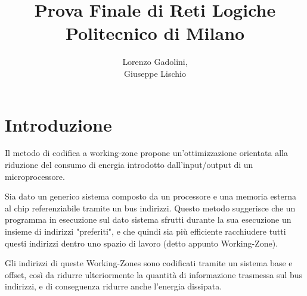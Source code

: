 \documentclass{article}
\title{Prova Finale di Reti Logiche\\ \large Politecnico di Milano}
\author{Lorenzo Gadolini, \\ Giuseppe Lischio}
\begin{document}
\maketitle


\tableofcontents


\newpage
{}




\setcounter{page}{1}


\section{Introduzione}
\begin{flushleft}
Il metodo di codifica a working-zone propone un'ottimizzazione orientata alla riduzione del consumo di energia introdotto dall'input/output di un microprocessore.

\medskip

Sia dato un generico sistema composto da un processore e una memoria esterna al chip referenziabile tramite un bus indirizzi. Questo metodo suggerisce che un programma in esecuzione sul dato sistema sfrutti durante la sua esecuzione un insieme di indirizzi "preferiti", e che quindi sia più efficiente racchiudere tutti questi indirizzi dentro uno spazio di lavoro (detto appunto Working-Zone). 

\medskip

Gli indirizzi di queste Working-Zones sono codificati tramite un sistema base e offset, così da ridurre ulteriormente la quantità di informazione trasmessa sul bus indirizzi, e di conseguenza ridurre anche l'energia dissipata.

\end{flushleft}
\end{document}
